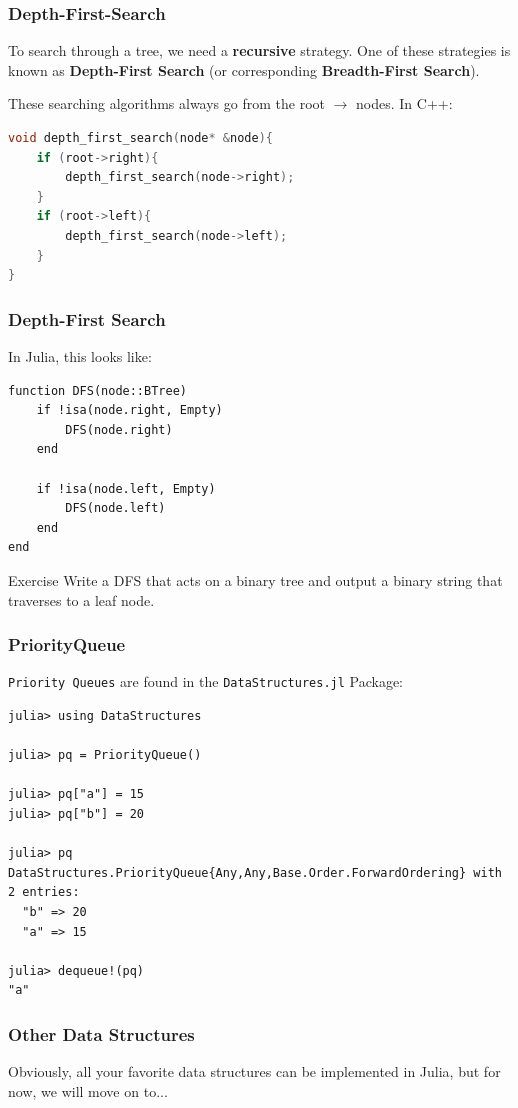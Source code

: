\documentclass{beamer}
\begin{document}
\begin{frame}[fragile]
\frametitle{Depth-First-Search}
To search through a tree, we need a \textbf{recursive} strategy. One of these strategies is known as \textbf{Depth-First Search} (or corresponding \textbf{Breadth-First Search}). 

\vspace{0.5cm}
These searching algorithms always go from the root $\rightarrow$ nodes. In C++:
\begin{lstlisting}[language=c++]
void depth_first_search(node* &node){
    if (root->right){
        depth_first_search(node->right);
    }
    if (root->left){
        depth_first_search(node->left);
    }
}
\end{lstlisting}
\end{frame}

\begin{frame}[fragile]
\frametitle{Depth-First Search}
In Julia, this looks like:
\begin{lstlisting}
function DFS(node::BTree)
    if !isa(node.right, Empty)
        DFS(node.right)
    end
    
    if !isa(node.left, Empty)
        DFS(node.left)
    end
end

\end{lstlisting}
\begin{block}{Exercise}
Write a DFS that acts on a binary tree and output a binary string that traverses to a leaf node.
\end{block}
\end{frame}

\begin{frame}[fragile]
\frametitle{PriorityQueue}
\texttt{Priority Queues} are found in the \texttt{DataStructures.jl} Package:
\begin{lstlisting}
julia> using DataStructures

julia> pq = PriorityQueue()

julia> pq["a"] = 15
julia> pq["b"] = 20

julia> pq
DataStructures.PriorityQueue{Any,Any,Base.Order.ForwardOrdering} with 2 entries:
  "b" => 20
  "a" => 15

julia> dequeue!(pq)
"a"
\end{lstlisting}
\end{frame}

\begin{frame}
\frametitle{Other Data Structures}
Obviously, all your favorite data structures can be implemented in Julia, but for now, we will move on to...
\end{frame}
\end{document}
